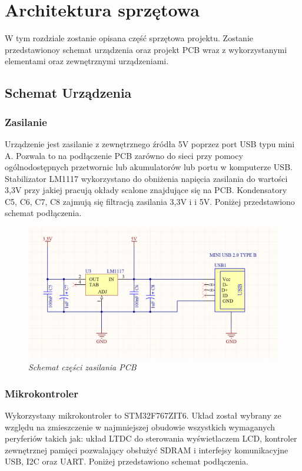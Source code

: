 \documentclass[eng,printmode]{mgr}
\begin{document}
\chapter{ Architektura sprzętowa}
W tym rozdziale zostanie opisana część sprzętowa projektu. Zostanie przedstawionoy schemat urządzenia oraz projekt PCB wraz z wykorzystanymi elementami oraz zewnętrznymi urządzeniami.


\section{ Schemat Urządzenia}
\subsection*{Zasilanie}
Urządzenie jest zasilanie z zewnętrznego źródła 5V poprzez port USB typu mini A. Pozwala to na podłączenie PCB zarówno do sieci przy pomocy ogólnodostępnych przetwornic lub akumulatorów lub portu w komputerze USB. Stabilizator LM1117 wykorzystano do obniżenia napięcia zasilania do wartości 3,3V przy jakiej pracują okłady scalone znajdujące się na PCB. Kondensatory C5, C6, C7, C8 zajmują się filtracją zasilania 3,3V i i 5V.
Poniżej przedstawiono schemat podłączenia.

\begin{figure}[!h]
    \centering
    \includegraphics[width=\textwidth]{schematics/power.png}
    \caption{\textit{Schemat części zasilania PCB}}
\end{figure}
\subsection*{Mikrokontroler}
Wykorzystany mikrokontroler to STM32F767ZIT6. Układ został wybrany ze względu na zmieszczenie w najmniejszej obudowie wszystkich wymaganych peryferiów takich jak: układ LTDC do sterowania wyświetlaczem LCD, kontroler zewnętrznej pamięci pozwalający obsłużyć SDRAM i interfejsy komunikacyjne USB, I2C oraz UART. Poniżej przedstawiono schemat podłączenia.
\end{document}
